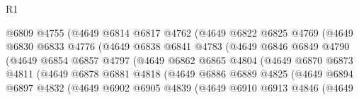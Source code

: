 \begin{lexlean}{R1}
\begin{coremodule}
                            @6809
                            @4755
                            (@4649
                              @6814
                              @6817
                              @4762
                              (@4649
                                @6822
                                @6825
                                @4769
                                (@4649
                                  @6830
                                  @6833
                                  @4776
                                  (@4649
                                    @6838
                                    @6841
                                    @4783
                                    (@4649
                                      @6846
                                      @6849
                                      @4790
                                      (@4649
                                        @6854
                                        @6857
                                        @4797
                                        (@4649
                                          @6862
                                          @6865
                                          @4804
                                          (@4649
                                            @6870
                                            @6873
                                            @4811
                                            (@4649
                                              @6878
                                              @6881
                                              @4818
                                              (@4649
                                                @6886
                                                @6889
                                                @4825
                                                (@4649
                                                  @6894
                                                  @6897
                                                  @4832
                                                  (@4649
                                                    @6902
                                                    @6905
                                                    @4839
                                                    (@4649
                                                      @6910
                                                      @6913
                                                      @4846
                                                      (@4649

\end{coremodule}
\end{lexlean}
